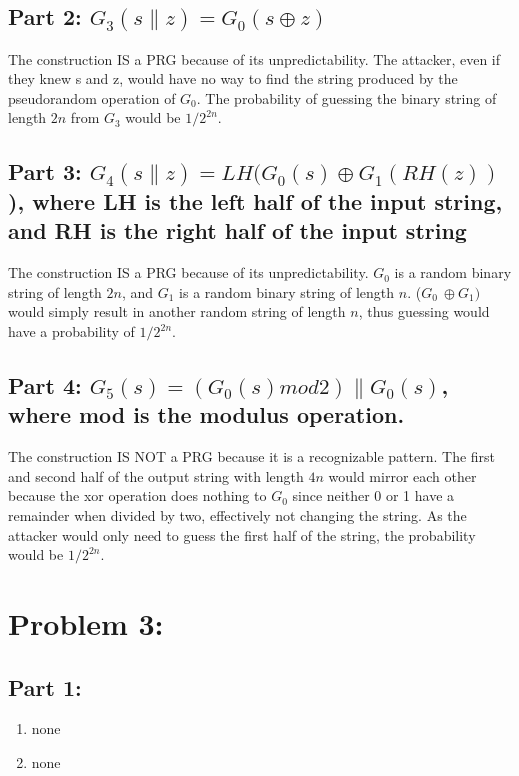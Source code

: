 \documentclass{article} %
\begin{document}
\subsection{Part 2: \(G_3(s \parallel z) = G_0(s \oplus z)\)}
The construction IS a PRG because of its unpredictability. The attacker, even if they knew s and z, would have no way to find the string produced by the pseudorandom operation of \(G_0\). The probability of guessing the binary string of length \(2n\) from \(G_3\) would be \(1/2^{2n}\).

\subsection{Part 3: \(G_4(s \parallel z) = LH(G_0(s) \oplus G_1(RH(z))\)), where LH is the left half of the input string, and RH is the right half of the input string}
The construction IS a PRG because of its unpredictability. \(G_0\) is a random binary string of length \(2n\), and \(G_1\) is a random binary string of length \(n\). (\(G_0\ \oplus G_1)\) would simply result in another random string of length \(n\), thus guessing would have a probability of \(1/2^{2n}\).

\subsection{Part 4: \(G_5(s)= (G_0(s) mod 2) \parallel G_0(s)\), where mod is the modulus operation.}
The construction IS NOT a PRG because it is a recognizable pattern. The first and second half of the output string with length \(4n\) would mirror each other because the xor operation does nothing to \(G_0\) since neither 0 or 1 have a remainder when divided by two, effectively not changing the string. As the attacker would only need to guess the first half of the string, the probability would be \(1/2^{2n}\). 

\section{Problem 3:}

\subsection{Part 1:}
\begin{enumerate}
    \item none
    \item none
\end{enumerate}
\end{document}
